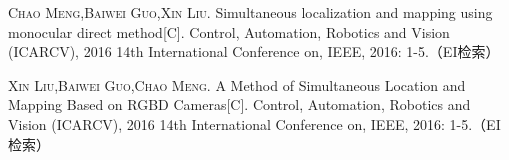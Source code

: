 

\begin{publications}{99}

    \item\textsc{Chao Meng,Baiwei Guo,Xin Liu}. {Simultaneous localization and mapping using monocular direct method}[C]. Control, Automation, Robotics and Vision (ICARCV), 2016 14th International Conference on, IEEE, 2016: 1-5.（EI检索）
      
       \item\textsc{Xin Liu,Baiwei Guo,Chao Meng}. {A Method of Simultaneous Location and Mapping Based on RGBD Cameras}[C]. Control, Automation, Robotics and Vision (ICARCV), 2016 14th International Conference on, IEEE, 2016: 1-5.（EI检索）
    
\end{publications}